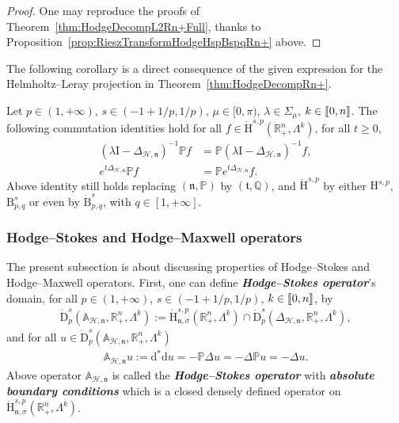 \documentclass[10pt]{amsart}
\theoremstyle{definition}\newtheorem{defi}[theo]{Definition}\newtheorem{rema}[theo]{Remark}\newtheorem{exam}[theo]{Example}\newtheorem{exem}[theo]{Example}\newtheorem{nota}[theo]{Notation}
\newcommand{\bbP}{\mathbb{P}}
\newcommand{\bbA}{\mathbb{A}}
\newcommand{\bbR}{\mathbb{R}}
\newcommand{\bbQ}{\mathbb{Q}}
\newcommand{\rmH}{\mathrm{H}}%
\newcommand{\rmB}{\mathrm{B}}
\newcommand{\rmd}{\mathrm{d}}
\newcommand{\rmD}{\mathrm{D}}
\newcommand{\rmI}{\mathrm{I}}
\newcommand{\clH}{\mathcal{H}}
\newcommand{\fkn}{\mathfrak{n}}
\newcommand{\fkt}{\mathfrak{t}}
\newcommand{\llbracket}{\mathopen{[\mkern -2.7mu[}}
\newcommand{\rrbracket}{\mathclose{]\mkern -2.7mu]}}
\newcommand{\llb}{\llbracket}
\newcommand{\rrb}{\rrbracket}
\begin{document}
\begin{proof}
One may reproduce the proofs of Theorem~\ref{thm:HodgeDecompL2Rn+Full}, thanks to Proposition~\ref{prop:RieszTransformHodgeHspBspqRn+} above.
\end{proof}

The following corollary is a direct consequence of the given expression for the Helmholtz--Leray projection in Theorem~\ref{thm:HodgeDecompRn+}.

\begin{coro}\label{cor:commutrelationHodgeProjectorHspBspqRn+}
Let $p\in(1,+\infty)$, $s\in(-1+1/p,1/p)$,
$\mu\in[0,\pi)$, $\lambda\in\Sigma_\mu$, $k\in\llb 0,n\rrb$. The following commutation identities hold for all $f\in\dot{\rmH}^{s,p}(\bbR^n_+,\Lambda^k)$, for all $t\geqslant 0$,
\begin{align*}
\left(\lambda \rmI -\Delta_{\clH,\fkn}\right)^{-1} \bbP f &= \bbP\left(\lambda \rmI -\Delta_{\clH,\fkn}\right)^{-1} f ,\\
e^{t\Delta_{\clH,\fkn}} \bbP f &= \bbP e^{t\Delta_{\clH,\fkn}} f .
\end{align*}
Above identity still holds replacing $(\fkn,\bbP)$ by $(\fkt,\bbQ)$, and $\dot{\rmH}^{s,p}$ by either ${\rmH}^{s,p}$, ${\rmB}^s_{p,q}$ or even by $\dot{\rmB}^s_{p,q}$, with $q\in[1,+\infty]$.
\end{coro}

\subsubsection{Hodge--Stokes and Hodge--Maxwell operators}

The present subsection is about discussing properties of Hodge--Stokes and Hodge--Maxwell operators. First, one can define \textbf{\emph{Hodge--Stokes operator}}'s domain, for all $p\in(1,+\infty)$, $s\in(-1+1/p,1/p)$, $k\in\llb 0,n\rrb$, by
\begin{align}\label{eq:domainHodgeStokesAbsBC}
\dot{\rmD}^{s}_{p}\left(\bbA_{\clH,\fkn},\bbR^n_+,\Lambda^k\right):= \dot{\rmH}^{s,p}_{\fkn,\sigma}\left(\bbR^n_+,\Lambda^k\right)\cap\dot{\rmD}^{s}_{p}\left(\Delta_{\clH,\fkn},\bbR^n_+,\Lambda^k\right),
\end{align}
and for all $u\in \dot{\rmD}^{s}_{p}(\bbA_{\clH,\fkn},\bbR^n_+,\Lambda^k)$
\begin{align}\label{eq:defHodgeStokesAbsBC}
\bbA_{\clH,\fkn} u:= \rmd^\ast\rmd u = -\bbP\Delta u = -\Delta \bbP u =-\Delta u .
\end{align}
Above operator $\bbA_{\clH,\fkn}$ is called the \textbf{\emph{Hodge--Stokes operator}} with \textbf{\emph{absolute boundary conditions}} which is a closed densely defined operator on $\dot{\rmH}^{s,p}_{{\fkn},\sigma}(\bbR^n_+,\Lambda^k)$.
\end{document}

